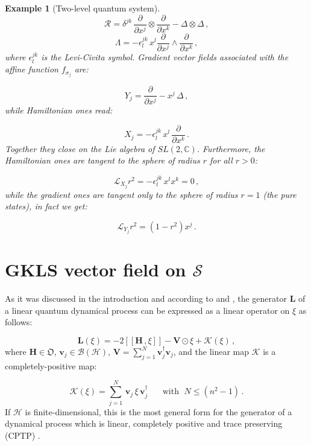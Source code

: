 \documentclass[11pt]{article}
\newcommand{\be}{\begin{equation}}
\newcommand{\ee}{\end{equation}}
\newcommand{\stsp}{\mathcal{S}}
\newcommand{\obsp}{\mathfrak{O}}
\newtheorem{exmp}{Example}
\begin{document}
\begin{exmp}[Two-level quantum system]
\be
\mathcal{R}= \delta^{jk}\,\frac{\partial}{\partial x^{j}}\otimes\frac{\partial}{\partial x^{k}} - \Delta\otimes\Delta\,,
\ee
\be
\Lambda= -\epsilon^{jk}_{l}\,x^{l}\frac{\partial}{\partial x^{j}}\wedge\frac{\partial}{\partial x^{k}}\,,
\ee
where $\epsilon^{jk}_{l}$ is the Levi-Civita symbol.
Gradient vector fields associated with the affine function $f_{\sigma_{j}}$ are:

\be
Y_{j}=\frac{\partial}{\partial x^{j}} - x^{j}\,\Delta \,,
\ee
while Hamiltonian ones read:

\be
X_{j}=-\epsilon^{jk}_{l}\,x^{l}\,\frac{\partial}{\partial x^{k}}\,.
\ee
Together they close on the Lie algebra of $SL(2,\mathbb{C})$.
Furthermore, the Hamiltonian ones are tangent to the sphere of radius $r$ for all $r>0$:

\be
\mathcal{L}_{X_{j}}r^{2}=-\epsilon^{jk}_{l}\,x^{l}x^{k}=0\,,
\ee
while the gradient ones are tangent only to the sphere of radius $r=1$ (the pure states), in fact we get:

\be
\mathcal{L}_{Y_{j}}r^{2}=(1 - r^{2})x^{j}\,.
\ee


\end{exmp}



\section{GKLS vector field on $\stsp$}\label{sec:GKLS vector field}



As it was discussed in the introduction and  according to \cite{gorini_kossakowski_sudarshan-completely_positive_dynamical_semigroups_of_N-level_systems} and \cite{lindblad-on_the_generators_of_quantum_dynamical_semigroups},  the generator $\mathbf{L}$ of a linear quantum dynamical process can be expressed as a linear operator on $\xi$ as follows:

\be\label{eqn: K-L equation}
\mathbf{L}(\xi)=-2\left[\left[\mathbf{H}\,,\xi\right]\right] - \mathbf{V}\odot\xi +\mathcal{K}(\xi)\,,
\ee
where $\mathbf{H}\in\obsp$, $\mathbf{v}_{j}\in\mathcal{B}(\mathcal{H})$,  $\mathbf{V}=\sum_{j=1}^{N}\mathbf{v}_{j}^{\dagger}\mathbf{v}_{j}$, and the linear map $\mathcal{K}$ is a completely-positive map: 

\be
\mathcal{K}(\xi)= \sum_{j=1}^{N}\,\mathbf{v}_{j}\,\xi\, \mathbf{v}^{\dagger}_{j}\;\;\;\;\;\mbox{ with } \;N\leq(n^{2}-1)\,.
\ee
If $\mathcal{H}$ is finite-dimensional, this is the most general form for the generator of a dynamical process which is linear, completely positive and trace preserving (CPTP) \cite{gorini_kossakowski_sudarshan-completely_positive_dynamical_semigroups_of_N-level_systems,lindblad-on_the_generators_of_quantum_dynamical_semigroups}.
\end{document}
